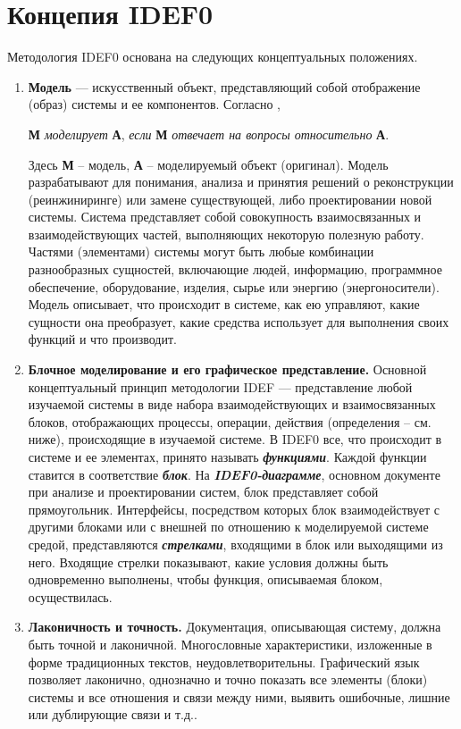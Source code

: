 \documentclass[a4paper, final]{article}
\begin{document}
\newpage
\section{Концепия IDEF0}
Методология IDEF0 основана на следующих концептуальных положениях.
\begin{enumerate}
	\item \textbf{Модель} --- искусственный объект, представляющий собой отображение (образ) системы и ее компонентов. Согласно \cite{bib:marka},

  \textbf{М} \textit{моделирует} \textbf{А}, \textit{если} \textbf{М} \textit{отвечает на вопросы относительно} \textbf{А}.

  Здесь \textbf{М} -- модель, \textbf{А} -- моделируемый объект (оригинал). Модель разрабатывают для понимания, анализа и принятия решений о реконструкции (реинжиниринге) или замене существующей, либо проектировании новой системы. Система представляет собой совокупность взаимосвязанных и взаимодействующих частей, выполняющих некоторую полезную работу. Частями  (элементами) системы могут быть любые комбинации разнообразных сущностей, включающие людей, информацию, программное обеспечение, оборудование, изделия, сырье или энергию (энергоносители). Модель описывает, что происходит в системе, как ею управляют, какие сущности она преобразует, какие средства использует для выполнения своих функций и что производит.

  \item \textbf{Блочное моделирование и его графическое представление.} Основной концептуальный принцип методологии IDEF --- представление любой изучаемой системы в виде набора взаимодействующих и взаимосвязанных блоков, отображающих процессы, операции, действия (определения -- см. ниже), происходящие в изучаемой системе. В IDEF0 все, что происходит в системе и ее элементах, принято называть \textbf{\textit{функциями}}. Каждой функции ставится в соответствие \textbf{\textit{блок}}. На \textbf{\textit{IDEF0-диаграмме}}, основном документе при анализе и проектировании систем, блок представляет собой прямоугольник. Интерфейсы, посредством которых блок взаимодействует с другими блоками или с внешней по отношению к моделируемой системе средой, представляются \textbf{\textit{стрелками}}, входящими в блок или выходящими из него. Входящие стрелки показывают, какие условия должны быть одновременно выполнены, чтобы функция, описываемая блоком, осуществилась.
  
  \item \textbf{Лаконичность и точность.} Документация, описывающая систему, должна быть точной и лаконичной. Многословные характеристики, изложенные в форме традиционных текстов, неудовлетворительны. Графический язык позволяет лаконично, однозначно и точно показать все элементы (блоки) системы и все отношения и связи между ними, выявить ошибочные, лишние или дублирующие связи и т.д..
  

\end{enumerate}
\end{document}
